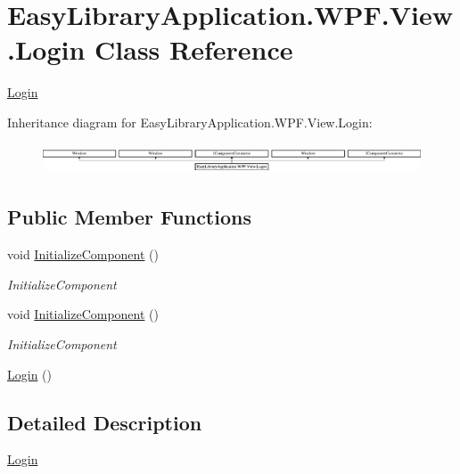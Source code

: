 \hypertarget{class_easy_library_application_1_1_w_p_f_1_1_view_1_1_login}{}\section{Easy\+Library\+Application.\+W\+P\+F.\+View.\+Login Class Reference}
\label{class_easy_library_application_1_1_w_p_f_1_1_view_1_1_login}


\mbox{\hyperlink{class_easy_library_application_1_1_w_p_f_1_1_view_1_1_login}{Login}}  


Inheritance diagram for Easy\+Library\+Application.\+W\+P\+F.\+View.\+Login\+:\begin{figure}[H]
\begin{center}
\leavevmode
\includegraphics[height=0.896000cm]{class_easy_library_application_1_1_w_p_f_1_1_view_1_1_login}
\end{center}
\end{figure}
\subsection*{Public Member Functions}
\begin{DoxyCompactItemize}
\item 
void \mbox{\hyperlink{class_easy_library_application_1_1_w_p_f_1_1_view_1_1_login_ad9e46d81378fcd9a2dcc78b38d86896e}{Initialize\+Component}} ()
\begin{DoxyCompactList}\small\item\em Initialize\+Component \end{DoxyCompactList}\item 
void \mbox{\hyperlink{class_easy_library_application_1_1_w_p_f_1_1_view_1_1_login_ad9e46d81378fcd9a2dcc78b38d86896e}{Initialize\+Component}} ()
\begin{DoxyCompactList}\small\item\em Initialize\+Component \end{DoxyCompactList}\item 
\mbox{\hyperlink{class_easy_library_application_1_1_w_p_f_1_1_view_1_1_login_a858c5a4d48f55af6dbf58f5334073e62}{Login}} ()
\end{DoxyCompactItemize}


\subsection{Detailed Description}
\mbox{\hyperlink{class_easy_library_application_1_1_w_p_f_1_1_view_1_1_login}{Login}} 


